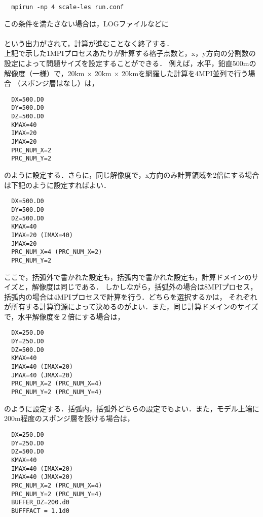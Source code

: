 \begin{verbatim}
  mpirun -np 4 scale-les run.conf
\end{verbatim}

この条件を満たさない場合は，LOGファイルなどに\\
\\

という出力がされて，計算が進むことなく終了する．\\
上記で示した1MPIプロセスあたりが計算する格子点数と，x，y方向の分割数の設定によって問題サイズを設定することができる．
例えば，水平，鉛直500mの解像度（一様）で，20km $\times$ 20km $\times$ 20kmを網羅した計算を4MPI並列で行う場合
（スポンジ層はなし）は， 

\begin{verbatim}
  DX=500.D0
  DY=500.D0
  DZ=500.D0
  KMAX=40
  IMAX=20
  JMAX=20
  PRC_NUM_X=2
  PRC_NUM_Y=2
\end{verbatim}

のように設定する．さらに，同じ解像度で，x方向のみ計算領域を2倍にする場合は下記のように設定すればよい．

\begin{verbatim}
  DX=500.D0
  DY=500.D0
  DZ=500.D0
  KMAX=40
  IMAX=20 (IMAX=40)
  JMAX=20
  PRC_NUM_X=4 (PRC_NUM_X=2)
  PRC_NUM_Y=2
\end{verbatim}

ここで，括弧外で書かれた設定も，括弧内で書かれた設定も，計算ドメインのサイズと，解像度は同じである．
しかしながら，括弧外の場合は8MPIプロセス，括弧内の場合は4MPIプロセスで計算を行う．どちらを選択するかは，
それぞれが所有する計算資源によって決めるのがよい．また，同じ計算ドメインのサイズで，水平解像度を２倍にする場合は，

\begin{verbatim}
  DX=250.D0
  DY=250.D0
  DZ=500.D0
  KMAX=40
  IMAX=40 (IMAX=20)
  JMAX=40 (JMAX=20)
  PRC_NUM_X=2 (PRC_NUM_X=4)
  PRC_NUM_Y=2 (PRC_NUM_Y=4)
\end{verbatim}

のように設定する．括弧内，括弧外どちらの設定でもよい．また，モデル上端に200m程度のスポンジ層を設ける場合は，

\begin{verbatim}
  DX=250.D0
  DY=250.D0
  DZ=500.D0
  KMAX=40
  IMAX=40 (IMAX=20)
  JMAX=40 (JMAX=20)
  PRC_NUM_X=2 (PRC_NUM_X=4)
  PRC_NUM_Y=2 (PRC_NUM_Y=4)
  BUFFER_DZ=200.d0
  BUFFFACT = 1.1d0
\end{verbatim}

